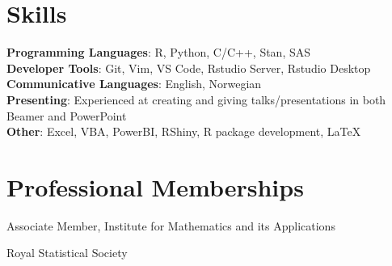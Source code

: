 \documentclass[letterpaper,11pt]{article}
\begin{document}
\section{Skills}
 \begin{itemize}[leftmargin=0.15in, label={}]
    \small{\item{
     \textbf{Programming Languages}{: R, Python, C/C++, Stan, SAS} \\
     \textbf{Developer Tools}{: Git, Vim,  VS Code, Rstudio Server, Rstudio Desktop} \\
     \textbf{Communicative Languages}: English, Norwegian \\
     \textbf{Presenting}{: Experienced at creating and giving talks/presentations in both Beamer and PowerPoint} \\
    \textbf{Other}{: Excel, VBA, PowerBI, RShiny, R package development, \LaTeX}
    }}
\end{itemize}

\section{Professional Memberships}
\begin{itemize}[leftmargin=0.15in, label={}]
    \small{\item{Associate Member, Institute for Mathematics and its Applications} \\
           \item{Royal Statistical Society}}
\end{itemize}

\end{document}
